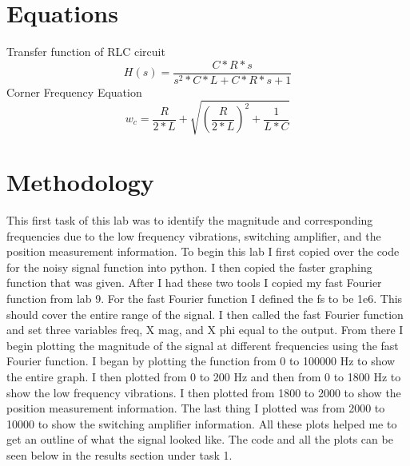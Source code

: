 \documentclass[11pt,a4]{report}
\begin{document}
\section{Equations}
Transfer function of RLC circuit
\begin{equation}
    H(s) = \frac{C*R*s}{s^2*C*L+C*R*s+1}
\end{equation}
Corner Frequency Equation
\begin{equation}
    w_c=\frac{R}{2*L}+\sqrt{(\frac{R}{2*L})^2+\frac{1}{L*C}}
\end{equation}

\section{Methodology}
This first task of this lab was to identify the magnitude and corresponding frequencies due to the low frequency vibrations, switching amplifier, and the position measurement information. To begin this lab I first copied over the code for the noisy signal function into python. I then copied the faster graphing function that was given. After I had these two tools I copied my fast Fourier function from lab 9. For the fast Fourier function I defined the fs to be 1e6. This should cover the entire range of the signal. I then called the fast Fourier function and set three variables freq, X mag, and X phi equal to the output. From there I begin plotting the magnitude of the signal at different frequencies using the fast Fourier function. I began by plotting the function from 0 to 100000 Hz to show the entire graph. I then plotted from 0 to 200 Hz and then from 0 to 1800 Hz to show the low frequency vibrations. I then plotted from 1800 to 2000 to show the position measurement information. The last thing I plotted was from 2000 to 10000 to show the switching amplifier information. All these plots helped me to get an outline of what the signal looked like. The code and all the plots can be seen below in the results section under task 1.
\end{document}
